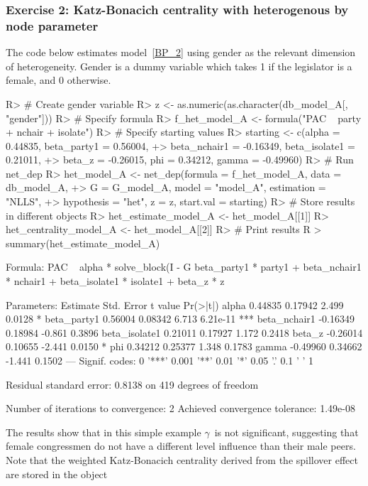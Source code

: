 \documentclass[nojss]{jss}
\begin{document}
\subsubsection{Exercise 2: Katz-Bonacich centrality with heterogenous by node parameter}

The code below estimates model~\ref{BP_2} using gender as the
relevant dimension of heterogeneity. Gender is a dummy variable
which takes 1 if the legislator is a female, and 0 otherwise. 
\begin{CodeChunk}
\begin{CodeInput}
R> # Create gender variable
R> z <- as.numeric(as.character(db_model_A[, "gender"]))
R> # Specify formula
R> f_het_model_A <- formula("PAC ~ party + nchair + isolate")
R> # Specify starting values
R> starting <- c(alpha = 0.44835, beta_party1 = 0.56004,
+> beta_nchair1 = -0.16349, beta_isolate1 = 0.21011,
+> beta_z = -0.26015, phi = 0.34212, gamma = -0.49960)
R> # Run net_dep
R> het_model_A <- net_dep(formula = f_het_model_A, data = db_model_A,
+> G = G_model_A, model = "model_A", estimation = "NLLS",
+> hypothesis = "het", z = z, start.val = starting)
R> # Store results in different objects
R> het_estimate_model_A <- het_model_A[[1]]
R> het_centrality_model_A <- het_model_A[[2]]
R> # Print results
R > summary(het_estimate_model_A)
\end{CodeInput}
\begin{CodeOutput}
Formula: PAC ~ alpha * solve_block(I - G %
beta_party1 * party1 + beta_nchair1 * nchair1 + beta_isolate1 * isolate1 + beta_z * z

Parameters:
Estimate Std. Error t value Pr(>|t|)    
alpha          0.44835    0.17942   2.499   0.0128 *  
beta_party1    0.56004    0.08342   6.713 6.21e-11 ***
beta_nchair1  -0.16349    0.18984  -0.861   0.3896    
beta_isolate1  0.21011    0.17927   1.172   0.2418    
beta_z        -0.26014    0.10655  -2.441   0.0150 *  
phi            0.34212    0.25377   1.348   0.1783    
gamma         -0.49960    0.34662  -1.441   0.1502    
---
Signif. codes:  0 '***' 0.001 '**' 0.01 '*' 0.05 '.' 0.1 ' ' 1

Residual standard error: 0.8138 on 419 degrees of freedom

Number of iterations to convergence: 2 
Achieved convergence tolerance: 1.49e-08
\end{CodeOutput}
\end{CodeChunk}
The results show that in this simple example $\gamma$\ is not significant, suggesting that female congressmen do not have a different level influence than their male peers. Note that the weighted Katz-Bonacich centrality derived from the spillover effect are stored in the object 
\end{document}
